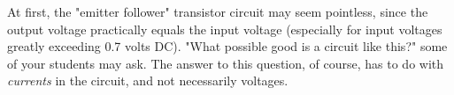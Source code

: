 





At first, the "emitter follower" transistor circuit may seem pointless, since the output voltage practically equals the input voltage (especially for input voltages greatly exceeding 0.7 volts DC).  "What possible good is a circuit like this?" some of your students may ask.  The answer to this question, of course, has to do with {\it currents} in the circuit, and not necessarily voltages.




